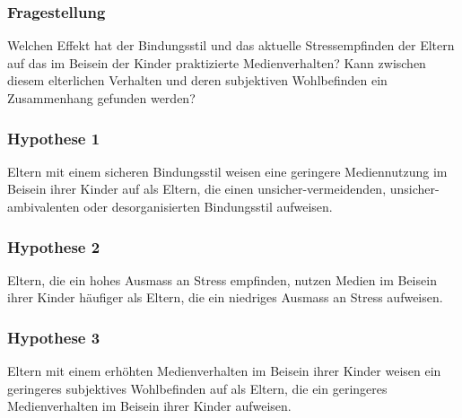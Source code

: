 \subsubsection{Fragestellung} 
Welchen Effekt hat der Bindungsstil und das aktuelle Stressempfinden der Eltern auf das im Beisein der Kinder praktizierte Medienverhalten? Kann zwischen diesem elterlichen Verhalten und deren subjektiven Wohlbefinden ein Zusammenhang gefunden werden?
\subsubsection{Hypothese 1}
Eltern mit einem sicheren Bindungsstil weisen eine geringere Mediennutzung im Beisein ihrer Kinder auf als Eltern, die einen unsicher-vermeidenden, unsicher-ambivalenten oder desorganisierten Bindungsstil aufweisen.
\subsubsection{Hypothese 2}
Eltern, die ein hohes Ausmass an Stress empfinden, nutzen Medien im Beisein ihrer Kinder häufiger als Eltern, die ein niedriges Ausmass an Stress aufweisen.
\subsubsection{Hypothese 3}
Eltern mit einem erhöhten Medienverhalten im Beisein ihrer Kinder weisen ein geringeres subjektives Wohlbefinden auf als Eltern, die ein geringeres Medienverhalten im Beisein ihrer Kinder aufweisen.

